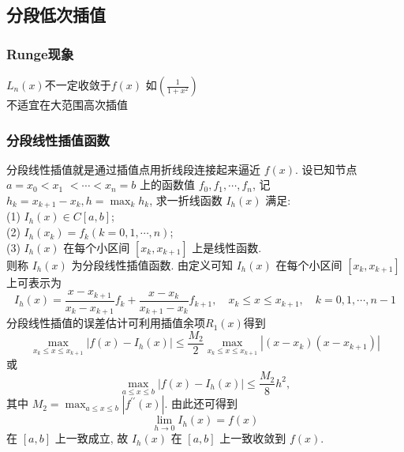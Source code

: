 \subsection{分段低次插值}

\subsubsection{Runge现象}
${L_{n}{(x)}}$不一定收敛于$f(x)$ 如$(\displaystyle\frac{1}{1 + x^2})$ \\
不适宜在大范围高次插值

\subsubsection{分段线性插值函数}
分段线性插值就是通过插值点用折线段连接起来逼近 $f(x)$. 设已知节点 $a=x_{0}<x_{1}$ $<\cdots<x_{n}=b$ 上的函数值 $f_{0}, f_{1}, \cdots, f_{n}$, 记 $h_{k}=x_{k+1}-x_{k}, h=\max _{k} h_{k}$, 求一折线函数 $I_{h}(x)$ 满足:\\
(1) $I_{h}(x) \in C[a, b]$;\\
(2) $I_{h}\left(x_{k}\right)=f_{k}(k=0,1, \cdots, n)$;\\
(3) $I_{h}(x)$ 在每个小区间 $\left[x_{k}, x_{k+1}\right]$ 上是线性函数.\\
则称 $I_{h}(x)$ 为分段线性插值函数.
由定义可知 $I_{h}(x)$ 在每个小区间 $\left[x_{k}, x_{k+1}\right]$ 上可表示为
$$
I_{h}(x)=\frac{x-x_{k+1}}{x_{k}-x_{k+1}} f_{k}+\frac{x-x_{k}}{x_{k+1}-x_{k}} f_{k+1}, \quad x_{k} \leq x \leq x_{k+1}, \quad k=0,1, \cdots, n-1
$$
分段线性插值的误差估计可利用插值余项$R_{1}{(x)}$得到
$$
\max _{x_{k} \leq x \leq x_{k+1}}\left|f(x)-I_{h}(x)\right| \leq \frac{M_{2}}{2} \max _{x_{k} \leq x \leq x_{k+1}}\left|\left(x-x_{k}\right)\left(x-x_{k+1}\right)\right|
$$
或
$$
\max _{a \leq x \leq b}\left|f(x)-I_{h}(x)\right| \leq \frac{M_{2}}{8} h^{2},
$$
其中 $M_{2}=\max _{a \leq x \leq b}\left|f^{\prime \prime}(x)\right|$. 由此还可得到
$$
\lim _{h \rightarrow 0} I_{h}(x)=f(x)
$$
在 $[a, b]$ 上一致成立, 故 $I_{h}(x)$ 在 $[a, b]$ 上一致收敛到 $f(x)$.

